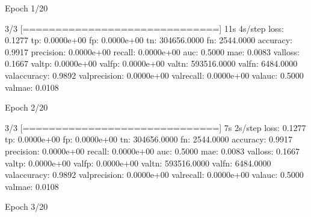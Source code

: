 \documentclass[letterpaper,10pt,english]{sphinxmanual}
\begin{document}
\begin{sphinxVerbatim}[commandchars=\\\{\}]
Epoch 1/20
\end{sphinxVerbatim}

\begin{sphinxVerbatim}[commandchars=\\\{\}]
3/3 [==============================] \PYGZhy{} 11s 4s/step \PYGZhy{} loss: 0.1277 \PYGZhy{} tp: 0.0000e+00 \PYGZhy{} fp: 0.0000e+00 \PYGZhy{} tn: 304656.0000 \PYGZhy{} fn: 2544.0000 \PYGZhy{} accuracy: 0.9917 \PYGZhy{} precision: 0.0000e+00 \PYGZhy{} recall: 0.0000e+00 \PYGZhy{} auc: 0.5000 \PYGZhy{} mae: 0.0083 \PYGZhy{} val\PYGZus{}loss: 0.1667 \PYGZhy{} val\PYGZus{}tp: 0.0000e+00 \PYGZhy{} val\PYGZus{}fp: 0.0000e+00 \PYGZhy{} val\PYGZus{}tn: 593516.0000 \PYGZhy{} val\PYGZus{}fn: 6484.0000 \PYGZhy{} val\PYGZus{}accuracy: 0.9892 \PYGZhy{} val\PYGZus{}precision: 0.0000e+00 \PYGZhy{} val\PYGZus{}recall: 0.0000e+00 \PYGZhy{} val\PYGZus{}auc: 0.5000 \PYGZhy{} val\PYGZus{}mae: 0.0108
\end{sphinxVerbatim}

\begin{sphinxVerbatim}[commandchars=\\\{\}]
Epoch 2/20
\end{sphinxVerbatim}

\begin{sphinxVerbatim}[commandchars=\\\{\}]
3/3 [==============================] \PYGZhy{} 7s 2s/step \PYGZhy{} loss: 0.1277 \PYGZhy{} tp: 0.0000e+00 \PYGZhy{} fp: 0.0000e+00 \PYGZhy{} tn: 304656.0000 \PYGZhy{} fn: 2544.0000 \PYGZhy{} accuracy: 0.9917 \PYGZhy{} precision: 0.0000e+00 \PYGZhy{} recall: 0.0000e+00 \PYGZhy{} auc: 0.5000 \PYGZhy{} mae: 0.0083 \PYGZhy{} val\PYGZus{}loss: 0.1667 \PYGZhy{} val\PYGZus{}tp: 0.0000e+00 \PYGZhy{} val\PYGZus{}fp: 0.0000e+00 \PYGZhy{} val\PYGZus{}tn: 593516.0000 \PYGZhy{} val\PYGZus{}fn: 6484.0000 \PYGZhy{} val\PYGZus{}accuracy: 0.9892 \PYGZhy{} val\PYGZus{}precision: 0.0000e+00 \PYGZhy{} val\PYGZus{}recall: 0.0000e+00 \PYGZhy{} val\PYGZus{}auc: 0.5000 \PYGZhy{} val\PYGZus{}mae: 0.0108
\end{sphinxVerbatim}

\begin{sphinxVerbatim}[commandchars=\\\{\}]
Epoch 3/20
\end{sphinxVerbatim}
\end{document}
